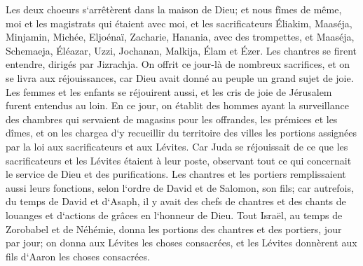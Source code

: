 \verse Les deux choeurs s`arrêtèrent dans la maison de Dieu; et nous fîmes de même, moi et les magistrats qui étaient avec moi, 
\verse et les sacrificateurs Éliakim, Maaséja, Minjamin, Michée, Eljoénaï, Zacharie, Hanania, avec des trompettes, 
\verse et Maaséja, Schemaeja, Éléazar, Uzzi, Jochanan, Malkija, Élam et Ézer. Les chantres se firent entendre, dirigés par Jizrachja. 
\verse On offrit ce jour-là de nombreux sacrifices, et on se livra aux réjouissances, car Dieu avait donné au peuple un grand sujet de joie. Les femmes et les enfants se réjouirent aussi, et les cris de joie de Jérusalem furent entendus au loin. 
\verse En ce jour, on établit des hommes ayant la surveillance des chambres qui servaient de magasins pour les offrandes, les prémices et les dîmes, et on les chargea d`y recueillir du territoire des villes les portions assignées par la loi aux sacrificateurs et aux Lévites. Car Juda se réjouissait de ce que les sacrificateurs et les Lévites étaient à leur poste, 
\verse observant tout ce qui concernait le service de Dieu et des purifications. Les chantres et les portiers remplissaient aussi leurs fonctions, selon l`ordre de David et de Salomon, son fils; 
\verse car autrefois, du temps de David et d`Asaph, il y avait des chefs de chantres et des chants de louanges et d`actions de grâces en l`honneur de Dieu. 
\verse Tout Israël, au temps de Zorobabel et de Néhémie, donna les portions des chantres et des portiers, jour par jour; on donna aux Lévites les choses consacrées, et les Lévites donnèrent aux fils d`Aaron les choses consacrées. 

